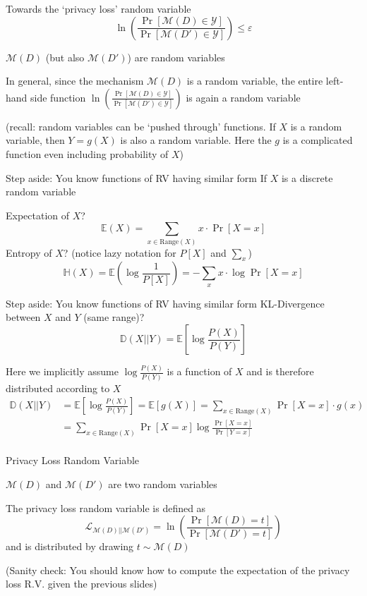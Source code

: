 \documentclass[12pt,aspectratio=169,handout]{beamer}
\begin{document}
\begin{frame}{Towards the `privacy loss' random variable}
$$
\ln \left( \frac{
\Pr[\mathcal{M}(D) \in \mathcal{Y}]
}{
\Pr[\mathcal{M}(D') \in \mathcal{Y}]
}
\right)
\leq \varepsilon
$$

$\mathcal{M}(D)$ (but also $\mathcal{M}(D')$) are random variables

\pause

In general, since the mechanism $\mathcal{M}(D)$ is a random variable, the entire left-hand side function
$
\ln \left( \frac{
\Pr[\mathcal{M}(D) \in \mathcal{Y}]
}{
\Pr[\mathcal{M}(D') \in \mathcal{Y}]
}
\right)
$
is again a random variable

(recall: random variables can be `pushed through' functions. If $X$ is a random variable, then $Y = g(X)$ is also a random variable. Here the $g$ is a complicated function even including probability of $X$)

\end{frame}




\begin{frame}{Step aside: You know functions of RV having similar form}
If $X$ is a discrete random variable

Expectation of $X$? \pause
$$
\mathbb{E}(X) = \sum_{x \in \text{Range}(X)} x \cdot \Pr[X = x]
$$
Entropy of $X$? (notice lazy notation for $P[X]$ and $\sum_x$)
$$
\mathbb{H}(X) = \mathbb{E}\left(\log \frac{1}{P[X]}\right) = 
- \sum_{x} x \cdot \log \Pr[X = x]
$$
\end{frame}


\begin{frame}{Step aside: You know functions of RV having similar form}
KL-Divergence between $X$ and $Y$ (same range)?
$$
\mathbb{D}(X || Y) = \mathbb{E} \left[
\log \frac{P(X)}{P(Y)}
\right]
$$

Here we implicitly assume $\log \frac{P(X)}{P(Y)}$ is a function of $X$ and is therefore distributed according to $X$
$$
\begin{aligned}
\mathbb{D}(X || Y) &= \mathbb{E} \left[
\log \frac{P(X)}{P(Y)}
\right]
= \mathbb{E}[g(X)] = 
\sum_{x \in \text{Range}(X)} \Pr[X = x] \cdot g(x) \\
&= \sum_{x \in \text{Range}(X)} \Pr[X = x] \log \frac{\Pr[X = x]}{\Pr[Y = x]} \\
\end{aligned}
$$
\end{frame}


\begin{frame}{Privacy Loss Random Variable}

$\mathcal{M}(D)$ and $\mathcal{M}(D')$ are two random variables

The privacy loss random variable is defined as
$$
\mathcal{L}_{\mathcal{M}(D) || \mathcal{M}(D')}
=
\ln \left( \frac{
\Pr[\mathcal{M}(D) = t]
}{
\Pr[\mathcal{M}(D') = t]
}
\right)
$$
and is distributed by drawing $t \sim \mathcal{M}(D)$

(Sanity check: You should know how to compute the expectation of the privacy loss R.V. given the previous slides)
\end{frame}
\end{document}
